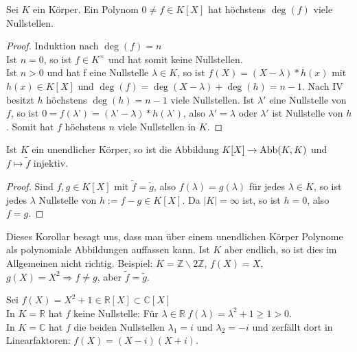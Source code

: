 \begin{conclusion}
	Sei $K$ ein Körper. Ein Polynom $0\neq f \in K[X]$ hat höchstens $\deg(f)$ viele
	Nullstellen.
\end{conclusion}
\begin{proof}
	Induktion nach $\deg(f)=n$ \\
	Ist $n=0$, so ist $f \in K^{\times}$ und hat somit keine Nullstellen. \\
	Ist $n>0$ und hat f eine Nullstelle $\lambda \in K$, so ist $f(X)=(X-\lambda)*h(x)$ mit $h(x) \in K[X]$ und
	$\deg(f)=\deg(X-\lambda)+\deg(h)=n-1$. Nach IV besitzt $h$ höchstens $\deg(h)=n-1$ viele Nullstellen. Ist
	$\lambda'$ eine Nullstelle von $f$, so ist $0=f(\lambda’)=(\lambda’-\lambda)*h(\lambda’)$, also $\lambda'=
	\lambda$ oder $\lambda'$ ist Nullstelle von $h$. Somit hat $f$ höchstens $n$ viele Nullstellen in $K$.
\end{proof}

\begin{conclusion}
	Ist $K$ ein unendlicher Körper, so ist die Abbildung $K[X] \to \operatorname{Abb}(K,K)$ und $f \mapsto
	\tilde f$ injektiv.
\end{conclusion}
\begin{proof}
	Sind $f,g \in K[X]$ mit $\tilde f = \tilde g$, also $f(\lambda)=g(\lambda)$ für jedes $\lambda \in K$, so ist
	jedes $\lambda$ Nullstelle von $h:= f-g \in K[X]$. Da $|K|=\infty$ ist, so ist $h=0$, also $f=g$.
\end{proof}

\begin{remark}
	Dieses Korollar besagt uns, dass man über einem unendlichen Körper Polynome als
	polynomiale Abbildungen auffassen kann. Ist $K$ aber endlich, so ist dies im Allgemeinen nicht richtig.
	Beispiel: $K=\mathbb Z\backslash 2\mathbb Z$, $f(X)=X$, $g(X)=X^2 \Rightarrow f \neq g$, aber 
	$\tilde f=\tilde g$.
\end{remark}

\begin{example}
	Sei $f(X)=X^2+1 \in \mathbb R[X] \subset \mathbb C[X]$ \\
	In $K=\mathbb R$ hat $f$ keine Nullstelle: Für $\lambda \in \mathbb R\; f(\lambda)=\lambda^2+1 \ge1 >0$. \\
	In $K=\mathbb C$ hat $f$ die beiden Nullstellen $\lambda_1=i$ und $\lambda_2=-i$ und zerfällt dort in Linearfaktoren:
	$f(X)=(X-i)(X+i)$.
\end{example}

